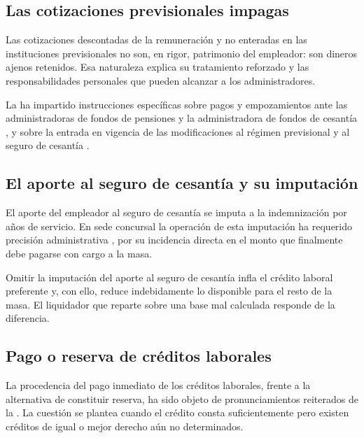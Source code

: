 \subsection{Las cotizaciones previsionales impagas}

Las cotizaciones descontadas de la remuneración y no enteradas en las instituciones
previsionales no son, en rigor, patrimonio del empleador: son dineros ajenos retenidos.
Esa naturaleza explica su tratamiento reforzado y las responsabilidades personales que
pueden alcanzar a los administradores.

La \superir{} ha impartido instrucciones específicas sobre pagos y empozamientos ante las
administradoras de fondos de pensiones y la administradora de fondos de cesantía
\parencite{oficio-334, oficio-5003}, y sobre la entrada en vigencia de las modificaciones
al régimen previsional y al seguro de cesantía \parencite{oficio-15795}.

\subsection{El aporte al seguro de cesantía y su imputación}

El aporte del empleador al seguro de cesantía se imputa a la indemnización por años de
servicio. En sede concursal la operación de esta imputación ha requerido precisión
administrativa \parencite{oficio-5080}, por su incidencia directa en el monto que
finalmente debe pagarse con cargo a la masa.

\begin{foco}
Omitir la imputación del aporte al seguro de cesantía infla el crédito laboral preferente
y, con ello, reduce indebidamente lo disponible para el resto de la masa. El liquidador
que reparte sobre una base mal calculada responde de la diferencia.
\end{foco}

\subsection{Pago o reserva de créditos laborales}

La procedencia del pago inmediato de los créditos laborales, frente a la alternativa de
constituir reserva, ha sido objeto de pronunciamientos reiterados de la \superir{}
\parencite{oficio-6499, oficio-1765}. La cuestión se plantea cuando el crédito consta
suficientemente pero existen créditos de igual o mejor derecho aún no determinados.


